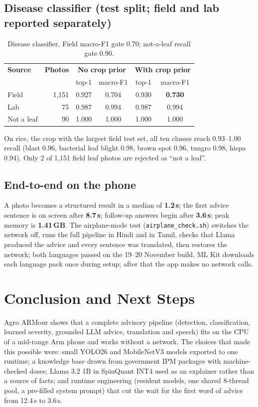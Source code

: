 \documentclass[11pt,a4paper]{article}
\begin{document}
\subsection{Disease classifier (test split; field and lab reported separately)}
\begin{table}[h]
\centering\small
\begin{tabular}{@{}lrcccc@{}}
\toprule
\textbf{Source} & \textbf{Photos} & \multicolumn{2}{c}{\textbf{No crop prior}} & \multicolumn{2}{c}{\textbf{With crop prior}} \\
 & & top-1 & macro-F1 & top-1 & macro-F1 \\
\midrule
Field & 1,151 & 0.927 & 0.704 & 0.930 & \textbf{0.730} \\
Lab & 75 & 0.987 & 0.994 & 0.987 & 0.994 \\
Not a leaf & 90 & 1.000 & 1.000 & 1.000 & 1.000 \\
\bottomrule
\end{tabular}
\caption{Disease classifier. Field macro-F1 gate 0.70; not-a-leaf recall gate 0.90.}
\end{table}

On rice, the crop with the largest field test set, all ten classes reach 0.93--1.00 recall (blast 0.96, bacterial leaf
blight 0.98, brown spot 0.96, tungro 0.98, hispa 0.94). Only 2 of 1,151 field leaf photos are rejected as ``not a leaf''.

\subsection{End-to-end on the phone}
A photo becomes a structured result in a median of \textbf{1.2\,s}; the first advice sentence is on screen after
\textbf{8.7\,s}; follow-up answers begin after \textbf{3.6\,s}; peak memory is \textbf{1.41\,GB}. The airplane-mode test
(\texttt{airplane\_check.sh}) switches the network off, runs the full pipeline in Hindi and in Tamil, checks that Llama
produced the advice and every sentence was translated, then restores the network; both languages passed on the 19--20 November build. ML Kit downloads
each language pack once during setup; after that the app makes no network calls.

\section{Conclusion and Next Steps}

Agro ARMour shows that a complete advisory pipeline (detection, classification, learned severity, grounded LLM advice,
translation and speech) fits on the CPU of a mid-range Arm phone and works without a network. The choices that made
this possible were: small YOLO26 and MobileNetV3 models exported to one runtime; a knowledge base drawn from government
IPM packages with machine-checked doses; Llama 3.2 1B in SpinQuant INT4 used as an explainer rather than a source of
facts; and runtime engineering (resident models, one shared 8-thread pool, a pre-filled system prompt) that cut the wait
for the first word of advice from 12.4\,s to 3.6\,s.
\end{document}

